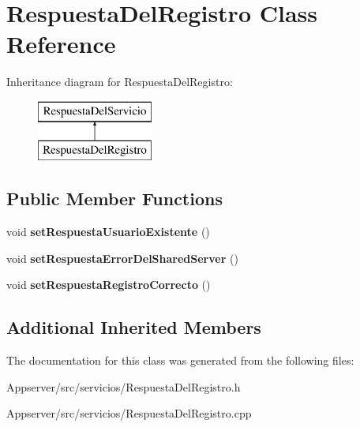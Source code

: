 \hypertarget{classRespuestaDelRegistro}{}\section{Respuesta\+Del\+Registro Class Reference}
\label{classRespuestaDelRegistro}
Inheritance diagram for Respuesta\+Del\+Registro\+:\begin{figure}[H]
\begin{center}
\leavevmode
\includegraphics[height=2.000000cm]{classRespuestaDelRegistro}
\end{center}
\end{figure}
\subsection*{Public Member Functions}
\begin{DoxyCompactItemize}
\item 
void {\bfseries set\+Respuesta\+Usuario\+Existente} ()\hypertarget{classRespuestaDelRegistro_ab76e3e0d237ce4435f841fe0986271dc}{}\label{classRespuestaDelRegistro_ab76e3e0d237ce4435f841fe0986271dc}

\item 
void {\bfseries set\+Respuesta\+Error\+Del\+Shared\+Server} ()\hypertarget{classRespuestaDelRegistro_a837a60bb365b0dcefdc2cd5973e07cb1}{}\label{classRespuestaDelRegistro_a837a60bb365b0dcefdc2cd5973e07cb1}

\item 
void {\bfseries set\+Respuesta\+Registro\+Correcto} ()\hypertarget{classRespuestaDelRegistro_a0af860cc761325577aebc936286868e8}{}\label{classRespuestaDelRegistro_a0af860cc761325577aebc936286868e8}

\end{DoxyCompactItemize}
\subsection*{Additional Inherited Members}


The documentation for this class was generated from the following files\+:\begin{DoxyCompactItemize}
\item 
Appserver/src/servicios/Respuesta\+Del\+Registro.\+h\item 
Appserver/src/servicios/Respuesta\+Del\+Registro.\+cpp\end{DoxyCompactItemize}
